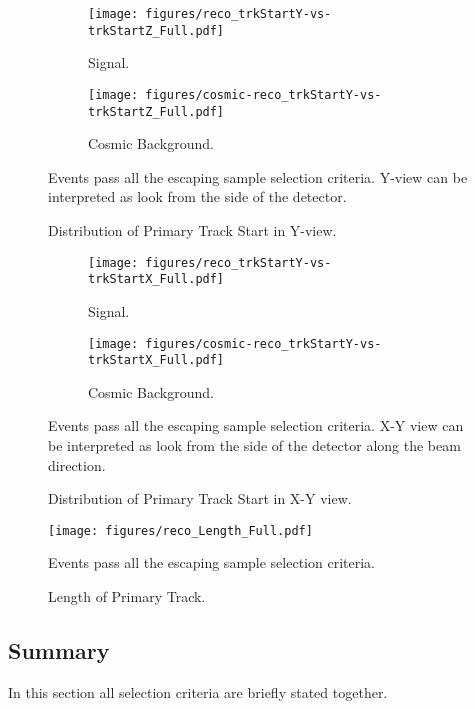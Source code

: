 \begin{figure}[!th]
\centering
\begin{subfigure}[t]{0.95\textwidth}
  \centering
  \texttt{[image: figures/reco\_trkStartY-vs-trkStartZ\_Full.pdf]}
  \caption{Signal.}
  \label{fig:startYZ_sig}
\end{subfigure}
\vspace{0.5cm}
\newline
\begin{subfigure}[t]{0.95\textwidth}
  \centering
  \texttt{[image: figures/cosmic-reco\_trkStartY-vs-trkStartZ\_Full.pdf]}
  \caption{Cosmic Background.}
  \label{fig:startYZ_bkg}
\end{subfigure}
\caption{ Distribution of Primary Track Start in Y-view.}
{ Events pass all the escaping sample selection criteria. Y-view can be interpreted as look from the side of the detector. }
\label{fig:startYZ}
\end{figure}

\begin{figure}[!th]
\centering
\begin{subfigure}[t]{0.95\textwidth}
  \centering
  \texttt{[image: figures/reco\_trkStartY-vs-trkStartX\_Full.pdf]}
  \caption{Signal.}
  \label{fig:startYX_sig}
\end{subfigure}
\vspace{0.5cm}
\newline
\begin{subfigure}[t]{0.95\textwidth}
  \centering
  \texttt{[image: figures/cosmic-reco\_trkStartY-vs-trkStartX\_Full.pdf]}
  \caption{Cosmic Background.}
  \label{fig:startYX_bkg}
\end{subfigure}
\caption{ Distribution of Primary Track Start in X-Y view.}
{ Events pass all the escaping sample selection criteria. X-Y view can be interpreted as look from the side of the detector
along the beam direction. }
\label{fig:startYX}
\end{figure}

\begin{figure}[!th]
\centering
\texttt{[image: figures/reco\_Length\_Full.pdf]}
\caption{Length of Primary Track.}
{ Events pass all the escaping sample selection criteria. }
\label{fig:length_3}
\end{figure}

\clearpage
\subsection{Summary} \label{evt_sel_sum}
In this section all selection criteria are briefly stated together. 

